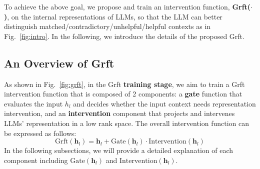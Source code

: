 










To achieve the above goal, we propose and train an intervention function, \textbf{Grft($\cdot$)}, on the internal representations of LLMs, so that the LLM can better distinguish matched/contradictory/unhelpful/helpful contexts as in Fig.~\ref{fig:intro}. In the following, we introduce the details of the proposed Grft. 

\subsection{An Overview of Grft}
\label{sec:Overview}




As shown in Fig.~\ref{fig:grft}, in the Grft \textbf{training stage}, we aim to train a Grft intervention function that is composed of 2 components: a \textbf{gate} function that evaluates the input $h_l$ and decides whether the input context needs representation intervention, and an \textbf{intervention} component that projects and intervenes LLMs' representation in a low rank space.  The overall intervention function can be expressed as follows:
\begin{equation}
    \text{Grft}(\mathbf{h}_l) = \mathbf{h}_l + \text{Gate}(\mathbf{h}_l) \cdot \text{Intervention}(\mathbf{h}_l)
    \label{eq:grft}
\end{equation}
In the following subsections, we will provide a detailed explanation of each component including $\text{Gate}(\mathbf{h}_l)$ and $\text{Intervention}(\mathbf{h}_l)$.

